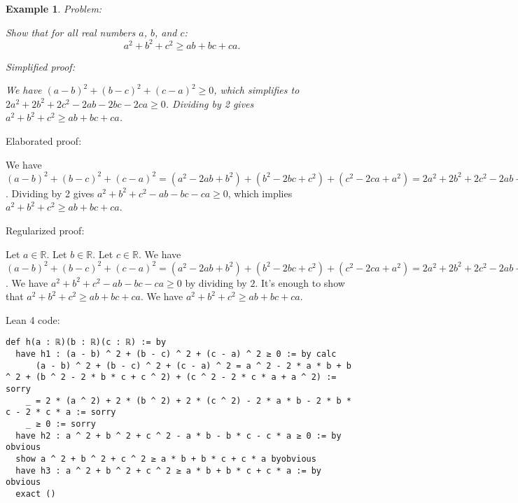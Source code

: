 \documentclass{article}
\newtheorem{example}{Example}
\begin{document}
\begin{example}
Problem:
\begin{tcolorbox}[colback=yellow!10, width=\linewidth]
Show that for all real numbers $a$, $b$, and $c$:
    $$a^2 + b^2 + c^2 \geq ab + bc + ca.$$
\end{tcolorbox}

Simplified proof:
\begin{tcolorbox}[colback=blue!10, width=\linewidth]
We have $(a-b)^2 + (b-c)^2 + (c-a)^2 \geq 0$, which simplifies to $2a^2 + 2b^2 + 2c^2 - 2ab - 2bc - 2ca \geq 0$. Dividing by 2 gives $a^2 + b^2 + c^2 \geq ab + bc + ca$.
\end{tcolorbox}
\end{example}

Elaborated proof:
\begin{tcolorbox}[colback=green!10, width=\linewidth]
We have $(a-b)^2 + (b-c)^2 + (c-a)^2 = (a^2 - 2ab + b^2) + (b^2 - 2bc + c^2) + (c^2 - 2ca + a^2) = 2a^2 + 2b^2 + 2c^2 - 2ab - 2bc - 2ca \geq 0$. Dividing by 2 gives $a^2 + b^2 + c^2 - ab - bc - ca \geq 0$, which implies $a^2 + b^2 + c^2 \geq ab + bc + ca$.
\end{tcolorbox}

Regularized proof:
\begin{tcolorbox}[colback=red!10, width=\linewidth]
Let $a\in\mathbb{R}$.
Let $b\in\mathbb{R}$.
Let $c\in\mathbb{R}$.
We have ${{(a-b)}}^2 + {{(b-c)}}^2 + {{(c-a)}}^2 = (a^2 - 2ab + b^2) + (b^2 - 2bc + c^2) + (c^2 - 2ca + a^2) = 2a^2 + 2b^2 + 2c^2 - 2ab - 2bc - 2ca \geq 0$. We have $a^2 + b^2 + c^2 - ab - bc - ca \geq 0$ by dividing by $2$.  It's enough to show that $a^2 + b^2 + c^2 \geq ab + bc + ca$. We have $a^2 + b^2 + c^2 \geq ab + bc + ca$.
\end{tcolorbox}

Lean 4 code:
\begin{tcolorbox}[colback=white!10, width=\linewidth]
\begin{lstlisting}[language=Lean4]
def h(a : ℝ)(b : ℝ)(c : ℝ) := by
  have h1 : (a - b) ^ 2 + (b - c) ^ 2 + (c - a) ^ 2 ≥ 0 := by calc
      (a - b) ^ 2 + (b - c) ^ 2 + (c - a) ^ 2 = a ^ 2 - 2 * a * b + b ^ 2 + (b ^ 2 - 2 * b * c + c ^ 2) + (c ^ 2 - 2 * c * a + a ^ 2) := sorry
    _ = 2 * (a ^ 2) + 2 * (b ^ 2) + 2 * (c ^ 2) - 2 * a * b - 2 * b * c - 2 * c * a := sorry
    _ ≥ 0 := sorry
  have h2 : a ^ 2 + b ^ 2 + c ^ 2 - a * b - b * c - c * a ≥ 0 := by obvious
  show a ^ 2 + b ^ 2 + c ^ 2 ≥ a * b + b * c + c * a byobvious
  have h3 : a ^ 2 + b ^ 2 + c ^ 2 ≥ a * b + b * c + c * a := by obvious
  exact ()
\end{lstlisting}
\end{tcolorbox}
\end{document}
